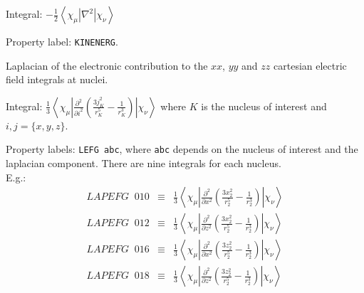 \begin{description}
\begin{list}{}{}
\item Integral:
$-\frac{1}{2}\left<\chi_{\mu}\left|\nabla^{2}\right|\chi_{\nu}\right>$
\item Property label: \verb|KINENERG|.
\end{list}

\item[\Key{LAPEFG}] Laplacian of the electronic contribution to the $xx$, $yy$ and $zz$ cartesian electric field integrals at nuclei.

\begin{list}{}{}
\item Integral: $\frac{1}{3}\left<\chi_{\mu}\left|\frac{\partial^2}{\partial i^2}\left(\frac{3j_K^2}{r_K^5}-\frac{1}{r_K^3}\right)\right|\chi_{\nu}\right>$ where $K$ is the nucleus of interest and $i,j= \{x,y,z\}$. \\
\item Property labels: \verb|LEFG abc|, where \verb|abc| depends on the nucleus of interest and the laplacian component. There are nine integrals for each nucleus. \\
E.g.:
\begin{eqnarray*}
LAPEFG\;\;010 &\equiv& \frac{1}{3}\left<\chi_{\mu}\left|\frac{\partial^2}{\partial x^2}\left(\frac{3x_2^2}{r_2^5}-\frac{1}{r_2^3}\right)\right|\chi_{\nu}\right>   \\
LAPEFG\;\;012 &\equiv& \frac{1}{3}\left<\chi_{\mu}\left|\frac{\partial^2}{\partial z^2}\left(\frac{3x_2^2}{r_2^5}-\frac{1}{r_2^3}\right)\right|\chi_{\nu}\right>   \\
LAPEFG\;\;016 &\equiv& \frac{1}{3}\left<\chi_{\mu}\left|\frac{\partial^2}{\partial x^2}\left(\frac{3z_2^2}{r_2^5}-\frac{1}{r_2^3}\right)\right|\chi_{\nu}\right>   \\
LAPEFG\;\;018 &\equiv& \frac{1}{3}\left<\chi_{\mu}\left|\frac{\partial^2}{\partial z^2}\left(\frac{3z_2^2}{r_2^5}-\frac{1}{r_2^3}\right)\right|\chi_{\nu}\right>
\end{eqnarray*}





\end{list}
\end{description}
